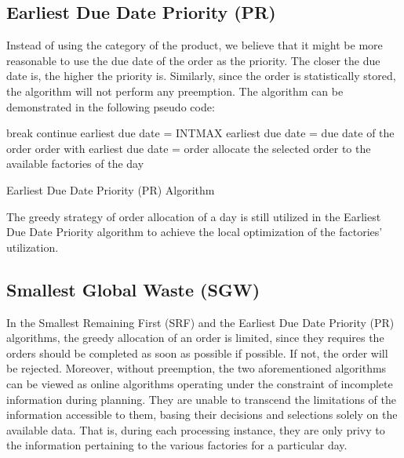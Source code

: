 \documentclass[a4paper, 12pt]{article}
\begin{document}
\subsection{Earliest Due Date Priority (PR)}

Instead of using the category of the product, we believe that it might be more reasonable to use the due date of the order as the priority. The closer
the due date is, the higher the priority is. Similarly, since the order is statistically stored, the algorithm will not perform any preemption. 
The algorithm can be demonstrated in the following pseudo code:

\begin{algorithm}[H]
     {
         {
            break\;
        }
         {
            continue\;
        }
        earliest due date = INT\textunderscore MAX\;
         {
             {
                earliest due date = due date of the order\;
                order with earliest due date = order\;
            }
        }
        allocate the selected order to the available factories of the day\;
    }
    \caption{Earliest Due Date Priority (PR) Algorithm}
\end{algorithm}

The greedy strategy of order allocation of a day is still utilized in the Earliest Due Date Priority algorithm to achieve the local optimization of the factories' utilization.

\subsection{Smallest Global Waste (SGW)}

In the Smallest Remaining First (SRF) and the Earliest Due Date Priority (PR) algorithms, the greedy allocation of an order is limited, since they requires the orders should be completed as soon as possible if possible.
If not, the order will be rejected. Moreover, without preemption, the two aforementioned algorithms can be viewed as online algorithms 
operating under the constraint of incomplete information during planning. They are unable to transcend the limitations of the information accessible to them, basing their decisions and selections solely on the available data. 
That is, during each processing instance, they are only privy to the information pertaining to the various factories for a particular day.
\end{document}
